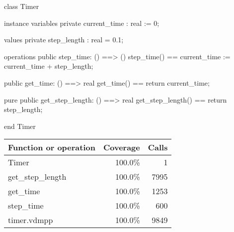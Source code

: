 \documentclass[a4paper]{article}
\begin{document}
\title{}
\author{}
\begin{vdm_al}
class Timer 

instance variables
    private current_time : real := 0;

values 
    private step_length : real = 0.1;

operations
    public step_time: () ==> ()
    step_time() == current_time := current_time + step_length;

    public get_time: () ==> real 
    get_time() == return current_time;

    pure public get_step_length: () ==> real
    get_step_length() == return step_length;

end Timer
\end{vdm_al}
\bigskip
\begin{longtable}{|l|r|r|}
\hline
Function or operation & Coverage & Calls \\
\hline
\hline
Timer & 100.0\% & 1 \\
\hline
get\_step\_length & 100.0\% & 7995 \\
\hline
get\_time & 100.0\% & 1253 \\
\hline
step\_time & 100.0\% & 600 \\
\hline
\hline
timer.vdmpp & 100.0\% & 9849 \\
\hline
\end{longtable}
\end{document}
